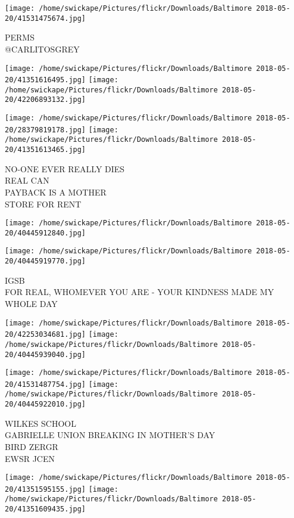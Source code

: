 \documentclass[10pt,letterpaper]{article}
\begin{document}
\vspace{0.25in}
\texttt{[image: /home/swickape/Pictures/flickr/Downloads/Baltimore 2018-05-20/41531475674.jpg]}

PERMS\\
@CARLITOSGREY
\pagebreak

\texttt{[image: /home/swickape/Pictures/flickr/Downloads/Baltimore 2018-05-20/41351616495.jpg]}
\texttt{[image: /home/swickape/Pictures/flickr/Downloads/Baltimore 2018-05-20/42206893132.jpg]}

\texttt{[image: /home/swickape/Pictures/flickr/Downloads/Baltimore 2018-05-20/28379819178.jpg]}
\texttt{[image: /home/swickape/Pictures/flickr/Downloads/Baltimore 2018-05-20/41351613465.jpg]}

NO{-}ONE EVER REALLY DIES\\
REAL CAN\\
PAYBACK IS A MOTHER\\
STORE FOR RENT
\pagebreak

\texttt{[image: /home/swickape/Pictures/flickr/Downloads/Baltimore 2018-05-20/40445912840.jpg]}

\vspace{0.25in}
\texttt{[image: /home/swickape/Pictures/flickr/Downloads/Baltimore 2018-05-20/40445919770.jpg]}

IGSB\\
FOR REAL, WHOMEVER YOU ARE {-} YOUR KINDNESS MADE MY WHOLE DAY
\pagebreak

\texttt{[image: /home/swickape/Pictures/flickr/Downloads/Baltimore 2018-05-20/42253034681.jpg]}
\texttt{[image: /home/swickape/Pictures/flickr/Downloads/Baltimore 2018-05-20/40445939040.jpg]}

\texttt{[image: /home/swickape/Pictures/flickr/Downloads/Baltimore 2018-05-20/41531487754.jpg]}
\texttt{[image: /home/swickape/Pictures/flickr/Downloads/Baltimore 2018-05-20/40445922010.jpg]}

WILKES SCHOOL\\
GABRIELLE UNION BREAKING IN MOTHER'S DAY\\
BIRD ZERGR\\
EWSR JCEN
\pagebreak

\texttt{[image: /home/swickape/Pictures/flickr/Downloads/Baltimore 2018-05-20/41351595155.jpg]}
\texttt{[image: /home/swickape/Pictures/flickr/Downloads/Baltimore 2018-05-20/41351609435.jpg]}
\end{document}
